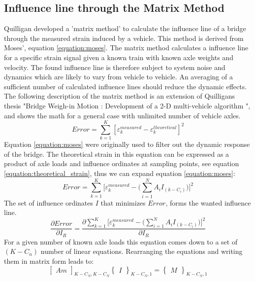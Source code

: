 \subsection{Influence line through the Matrix Method}
Quilligan \cite{Quilligan} developed a 'matrix method' to calculate the influence line of a bridge through the measured strain induced by a vehicle. This method is derived from Moses', equation \ref{equation:moses}. The matrix method calculates a influence line for a specific strain signal given a known train with known axle weights and velocity. The found influence line is therefore subject to system noise and dynamics which are likely to vary from vehicle to vehicle. An averaging of a sufficient number of calculated influence lines should reduce the dynamic effects. The following description of the matrix method is an extension of Quilligans thesis "Bridge Weigh-in Motion : Development of a 2-D multi-vehicle algorithm \cite{Quilligan}", and shows the math for a general case with unlimited number of vehicle axles.
\begin{equation}
Error = \sum_{k = 1}^{K} [\varepsilon_{k}^{measured} - \varepsilon_{k}^{theoretical}]^2
\label{equation:moses}
\end{equation}
Equation \ref{equation:moses} were originally used to filter out the dynamic response of the bridge.
The theoretical strain in this equation can be expressed as a product of axle loads and influence ordinates at sampling points, see equation \ref{equation:theoretical_strain}, thus we can expand equation \ref{equation:moses}:
\begin{equation}
Error = \sum_{k = 1}^{K} \Big[\varepsilon_{k}^{measured} - \Big(\sum_{i = 1}^{N} A_i I_{(k-C_i)}\Big)\Big]^2
\label{equation:moses_expanded}
\end{equation}
The set of influence ordinates $I$ that minimizes $Error$, forms the wanted influence line.
\begin{equation}
\frac{\partial Error}{\partial I_R} = \frac{\partial \sum_{k = 1}^{K} \Big[\varepsilon_{k}^{measured} - \Big(\sum_{i = 1}^{N} A_i I_{(k-C_i)}\Big)\Big]^2}{\partial I_R}
\end{equation}
For a given number of known axle loads this equation comes down to a set of $(K - C_n)$ number of linear equations. Rearranging the equations and writing them in matrix form leads to:
\begin{equation}
\begin{bmatrix} Am \end{bmatrix}_{K-C_N, K-C_N} \begin{Bmatrix} I \end{Bmatrix}_{K-C_N, 1} = \begin{Bmatrix} M \end{Bmatrix}_{K-C_N, 1}
\label{equation:matrixForm}
\end{equation}
